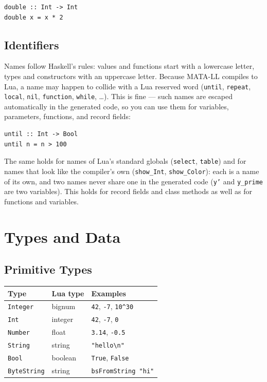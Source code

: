 \documentclass[11pt,a4paper]{article}
\begin{document}
\begin{lstlisting}
double :: Int -> Int
double x = x * 2
\end{lstlisting}

\subsection{Identifiers}

Names follow Haskell's rules: values and functions start with a lowercase
letter, types and constructors with an uppercase letter.  Because MATA-LL
compiles to Lua, a name may happen to collide with a Lua reserved word
(\texttt{until}, \texttt{repeat}, \texttt{local}, \texttt{nil},
\texttt{function}, \texttt{while}, \ldots).  This is fine --- such names are
escaped automatically in the generated code, so you can use them for
variables, parameters, functions, and record fields:

\begin{lstlisting}
until :: Int -> Bool
until n = n > 100
\end{lstlisting}

The same holds for names of Lua's standard globals (\texttt{select},
\texttt{table}) and for names that look like the compiler's own
(\texttt{show\_Int}, \texttt{show\_Color}): each is a name of its own,
and two names never share one in the generated code (\texttt{y'} and
\texttt{y\_prime} are two variables). This holds for record fields and
class methods as well as for functions and variables.

\section{Types and Data}

\subsection{Primitive Types}

\begin{tabular}{@{}lll@{}}
\toprule
\textbf{Type} & \textbf{Lua type} & \textbf{Examples} \\
\midrule
\texttt{Integer} & bignum   & \texttt{42}, \texttt{-7}, \texttt{10\^{}30} \\
\texttt{Int} & integer     & \texttt{42}, \texttt{-7}, \texttt{0} \\
\texttt{Number}  & float       & \texttt{3.14}, \texttt{-0.5} \\
\texttt{String}  & string      & \texttt{"hello\textbackslash n"} \\
\texttt{Bool}    & boolean     & \texttt{True}, \texttt{False} \\
\texttt{ByteString} & string   & \texttt{bsFromString "hi"} \\
\bottomrule
\end{tabular}
\end{document}
